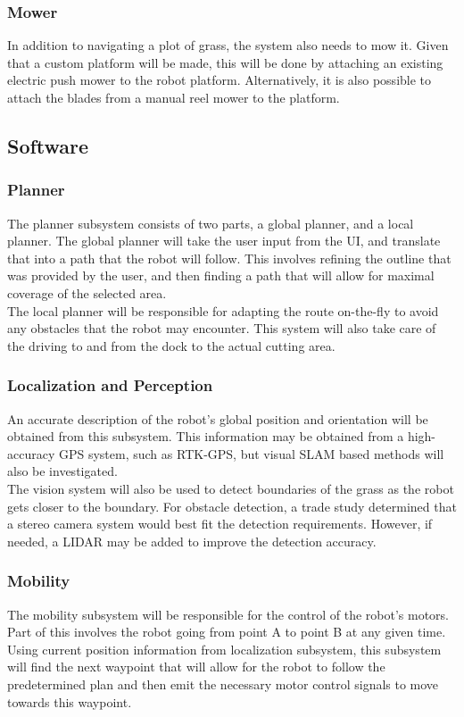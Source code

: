 \documentclass[12pt]{extarticle}
\begin{document}
		\subsubsection{Mower}
			In addition to navigating a plot of grass, the system also needs to mow it. Given that a custom platform will be made, this will be done by attaching an existing electric push mower to the robot platform. Alternatively, it is also possible to attach the blades from a manual reel mower to the platform. 
	
	\subsection{Software}
		\subsubsection{Planner}
			The planner subsystem consists of two parts, a global planner, and  a local planner. The global planner will take the user input from the UI, and translate that into a path that the robot will follow. This involves refining the outline that was provided by the user, and then finding a path that will allow for maximal coverage of the selected area. \\ 
			
			The local planner will be responsible for adapting the route on-the-fly to avoid any obstacles that the robot may encounter. This system will also take care of the driving to and from the dock to the actual cutting area. 
			
		\subsubsection{Localization and Perception}
			An accurate description of the robot's global position and orientation will be obtained from this subsystem. This information may be obtained from a high-accuracy GPS system, such as RTK-GPS, but visual SLAM based methods will also be investigated. \\
			
			The vision system will also be used to detect boundaries of the grass as the robot gets closer to the boundary. For obstacle detection, a trade study determined that a stereo camera system would best fit the detection requirements. However, if needed, a LIDAR may be added to improve the detection accuracy. 
		
		\subsubsection{Mobility}
			The mobility subsystem will be responsible for the control of the robot's motors. Part of this involves the robot going from point A to point B at any given time. Using current position information from localization subsystem, this subsystem will find the next waypoint that will allow for the robot to follow the predetermined plan and then emit the necessary motor control signals to move towards this waypoint. \\
			
\end{document}

